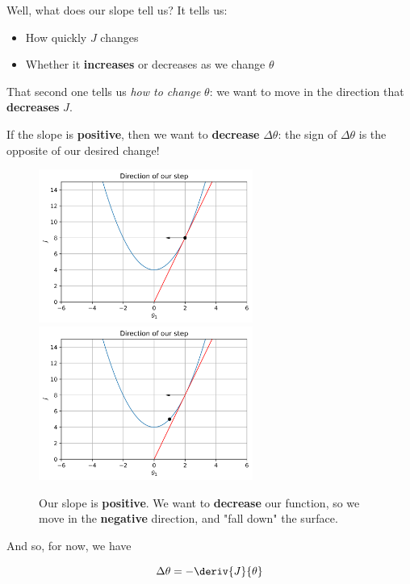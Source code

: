         Well, what does our slope tell us? It tells us:
        
        \begin{itemize}
            \item How quickly $J$ changes
            \item Whether it \textbf{increases} or decreases as we change $\theta$
        \end{itemize}
        
        That second one tells us \textit{how to change} $\theta$: we want to move in the direction that \textbf{decreases} $J$.
        
        If the slope is \textbf{positive}, then we want to \textbf{decrease} $\Delta \theta$: the sign of $\Delta \theta$ is the opposite of our desired change!
        
        \begin{figure}[H]
            \includegraphics[width=70mm,scale=0.5]{images/gradient_descent_images/taking_a_step.png}
            \includegraphics[width=70mm,scale=0.5]{images/gradient_descent_images/took_a_step.png}
            
            \caption*{Our slope is \textbf{positive}. We want to \textbf{decrease} our function, so we move in the \textbf{negative} direction, and "fall down" the surface.}
        \end{figure}
        
        And so, for now, we have
        
        \begin{equation}
            \Delta \theta = -\deriv{J}{\theta}
        \end{equation}\\
        
